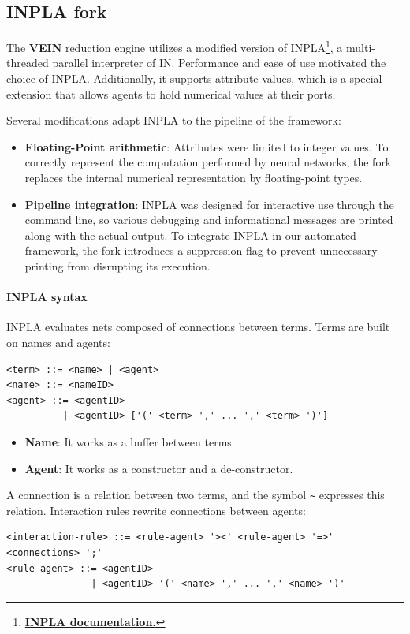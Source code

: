 \subsection{INPLA fork}
\label{sec:inpla}

The \textbf{VEIN} reduction engine utilizes a modified version of INPLA\footnote{\textbf{\href{https://github.com/inpla/inpla/blob/main/Gentle_introduction_Inpla.md}{INPLA documentation.}}},
a multi-threaded parallel interpreter of IN. Performance and ease of use motivated the choice of
INPLA. Additionally, it supports attribute values, which is a special extension that allows agents
to hold numerical values at their ports.

Several modifications adapt INPLA to the pipeline of the framework:
\begin{itemize}
	\item \textbf{Floating-Point arithmetic}: Attributes were limited to integer values. To correctly
		represent the computation performed by neural networks, the fork replaces the internal numerical
		representation by floating-point types.
	\item \textbf{Pipeline integration}: INPLA was designed for interactive use through the command line, so
		various debugging and informational messages are printed along with the actual output. To
		integrate INPLA in our automated framework, the fork introduces a suppression flag to prevent
		unnecessary printing from disrupting its execution.
\end{itemize}

\paragraph{INPLA syntax}
INPLA evaluates nets composed of connections between terms. Terms are built on names and agents:
\begin{small}
\begin{verbatim}
<term> ::= <name> | <agent>
<name> ::= <nameID>
<agent> ::= <agentID>
          | <agentID> ['(' <term> ',' ... ',' <term> ')']
\end{verbatim}
\end{small}
\begin{itemize}
	\item \textbf{Name}: It works as a buffer between terms.
	\item \textbf{Agent}: It works as a constructor and a de-constructor.
\end{itemize}
A connection is a relation between two terms, and the symbol \texttt{\~} expresses this relation.
Interaction rules rewrite connections between agents:
\begin{small}
\begin{verbatim}
<interaction-rule> ::= <rule-agent> '><' <rule-agent> '=>' <connections> ';'
<rule-agent> ::= <agentID>
               | <agentID> '(' <name> ',' ... ',' <name> ')'
\end{verbatim}
\end{small}

